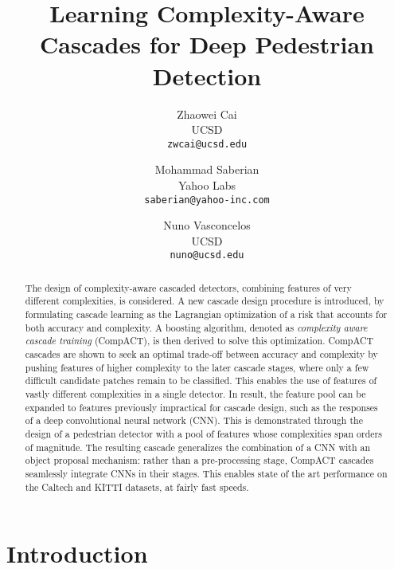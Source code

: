 \documentclass[10pt,twocolumn,letterpaper]{article}
\begin{document}
\title{Learning Complexity-Aware Cascades for Deep Pedestrian Detection}

\author{Zhaowei Cai\\
UCSD\\
{\tt\small zwcai@ucsd.edu}
\and
Mohammad Saberian\\
Yahoo Labs\\
{\tt\small saberian@yahoo-inc.com}
\and
Nuno Vasconcelos\\
UCSD\\
{\tt\small nuno@ucsd.edu}
}

\maketitle



\begin{abstract}
The design of complexity-aware cascaded detectors,
combining
features of very different complexities, is considered. A new cascade design
procedure is introduced,
by formulating cascade learning as the Lagrangian
optimization of a risk that accounts for both accuracy and complexity.
A boosting algorithm, denoted as {\it complexity aware cascade training}
(CompACT),  is then derived to solve this optimization. CompACT cascades
are shown to seek an optimal trade-off between accuracy and complexity by
pushing features of higher complexity to the later cascade stages, where only
a few difficult candidate patches remain to be classified. This
enables the use of features of vastly different complexities in a
single detector. In result, the feature pool can be expanded to
features previously impractical for cascade
design, such as the responses of a deep convolutional neural network (CNN).
This is demonstrated through the design of a pedestrian detector
with a pool of features whose complexities span orders of magnitude.
The resulting cascade generalizes the combination of a CNN with
an object proposal mechanism: rather than a pre-processing stage, CompACT
cascades seamlessly integrate CNNs in their stages. This enables
state of the art performance on the Caltech and KITTI datasets, at fairly
fast speeds.
\end{abstract}

\section{Introduction}
\label{sec:intro}
\end{document}
